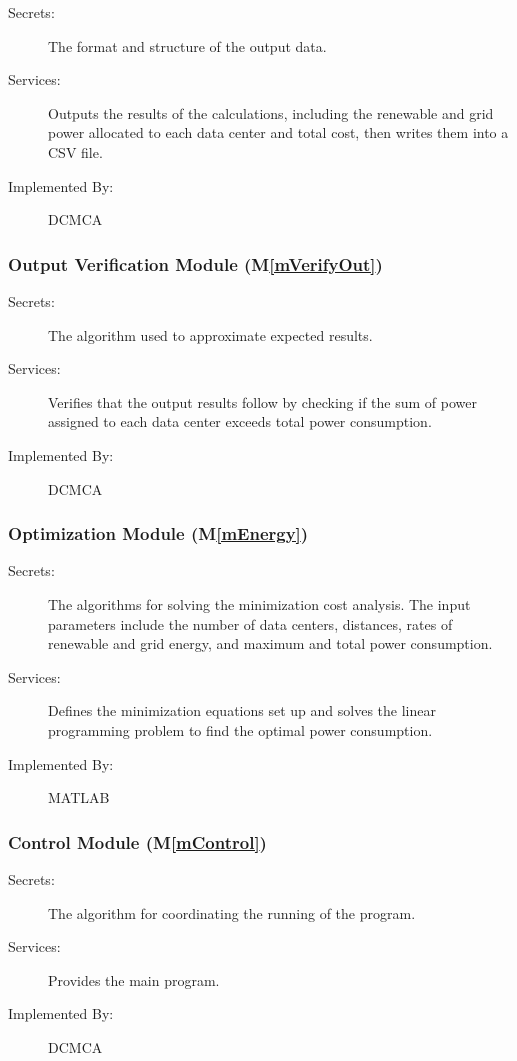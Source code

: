 \documentclass[12pt]{article}
\newcommand{\mref}[1]{M\ref{#1}}
\begin{document}
\begin{description}
\item[Secrets:] The format and structure of the output data.
\item[Services:] Outputs the results of the calculations, including the renewable and grid power allocated to each data center and total cost, then writes them into a CSV file.
\item[Implemented By:] DCMCA
\end{description} 

\subsubsection{Output Verification Module (\mref{mVerifyOut})}

\begin{description}
\item[Secrets:] The algorithm used to approximate expected results.
\item[Services:] Verifies that the output results follow by checking if the sum of power assigned to each data center exceeds total power consumption.
\item[Implemented By:] DCMCA
\end{description}


\subsubsection{Optimization Module (\mref{mEnergy})}

\begin{description}
\item[Secrets:] The algorithms for solving the minimization cost analysis. The input parameters include the number of data centers, distances, rates of renewable and grid energy, and maximum and total power consumption. 
\item[Services:] Defines the minimization equations set up and solves the linear programming problem to find the optimal power consumption.
\item[Implemented By:] MATLAB
\end{description} 

\subsubsection{Control Module (\mref{mControl})}

\begin{description}
\item[Secrets:] The algorithm for coordinating the running of the program.
\item[Services:] Provides the main program.
\item[Implemented By:] DCMCA
\end{description}
 
\end{document}
